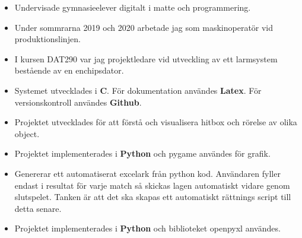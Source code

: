 \documentclass[10pt,a4paper,ragged2e]{altacv}
\begin{document}
    \begin{itemize}
    \item Undervisade gymnasieelever digitalt i matte och programmering.
\end{itemize}

\divider

\begin{itemize}
    \item Under sommrarna 2019 och 2020 arbetade jag som maskinoperatör vid produktionslinjen.
\end{itemize}

\newpage

\begin{fullwidth}

\begin{itemize}
  \item I kursen DAT290 var jag projektledare vid utveckling av ett larmsystem bestående av en enchipsdator.
  \item Systemet utvecklades i \textbf{C}. För dokumentation användes \textbf{Latex}. För versionskontroll användes \textbf{Github}.
\end{itemize}

\divider

\begin{itemize}
  \item Projektet utvecklades för att förstå och visualisera hitbox och rörelse av olika object.
  \item Projektet implementerades i \textbf{Python} och pygame användes för grafik.
\end{itemize}

\divider

\begin{itemize}
  \item Genererar ett automatiserat excelark från python kod. Användaren fyller endast i resultat för varje match så skickas lagen automatiskt vidare genom slutspelet. Tanken är att det ska skapas ett automatiskt rättnings script till detta senare.
  \item Projektet implementerades i \textbf{Python} och biblioteket openpyxl användes.
\end{itemize}


\end{fullwidth}
\end{document}
